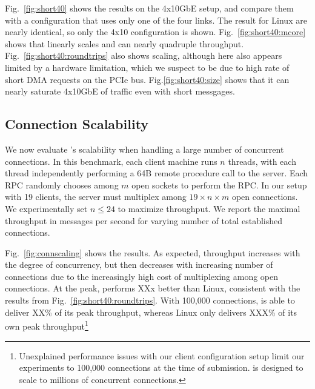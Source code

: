 Fig.~\ref{fig:short40} shows the results on the 4x10GbE setup, and
compare them with a configuration that uses only one of the four
links.  The result for Linux are nearly identical, so only the 4x10
configuration is shown.  Fig.~\ref{fig:short40:mcore} shows that \ix
linearly scales and can nearly quadruple throughput.
Fig.~\ref{fig:short40:roundtrips} also shows scaling, although here
also appears limited by a hardware limitation, which we suspect to be
due to high rate of short DMA requests on the PCIe bus.
Fig.\ref{fig:short40:size} shows that it can nearly saturate 4x10GbE
of traffic even with short messgages.

\subsection{Connection Scalability}

\label{sec:eval:scale}

We now evaluate \ix's scalability when handling a large number of
concurrent connections. In this benchmark, each client machine runs
$n$ threads, with each thread independently performing a 64B remote
procedure call to the server.  Each RPC randomly chooses among $m$
open sockets to perform the RPC.  In our setup with 19 clients, the
server must multiplex among $19 \times n \times m$ open connections.
We experimentally set $n \leq 24$ to maximize throughput.  We report
the maximal throughput in messages per second for varying number of
total established connections. 


Fig.~\ref{fig:connscaling} shows the results.  As expected, throughput
increases with the degree of concurrency, but then decreases with
increasing number of connections due to the increasingly high cost of
multiplexing among open connections.  At the peak, \ix performs XXx
better than Linux, consistent with the results from
Fig.~\ref{fig:short40:roundtrips}.  With 100,000 connections, \ix is
able to deliver XX\% of its peak throughput, whereas Linux only
delivers XXX\% of its own peak throughput\footnote{Unexplained
  performance issues with our client configuration setup limit our
  experiments to 100,000 connections at the time of submission. \ix is
  designed to scale to millions of concurrent connections.}


